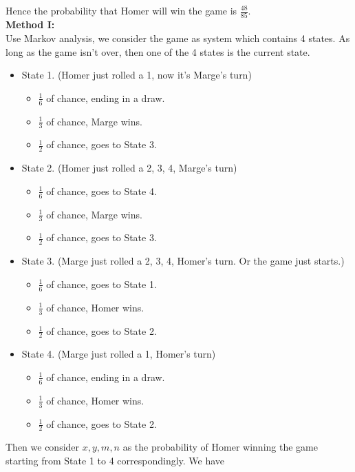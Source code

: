 \documentclass[a4paper, 11pt, twoside]{article}
\begin{document}
Hence the probability that Homer will win the game is $\frac{48}{85}.$\\

\textbf{Method I:}\\

Use Markov analysis, we consider the game as system which contains 4 states. As long as the game isn't over, then one of the 4 states is the current state.

\begin{itemize}
	\item State 1. (Homer just rolled a 1, now it's Marge's turn)
	\begin{itemize}
		\item $\frac{1}{6}$ of chance, ending in a draw.
		\item $\frac{1}{3}$ of chance, Marge wins.
		\item $\frac{1}{2}$ of chance, goes to State 3.
	\end{itemize}
	\item State 2. (Homer just rolled a 2, 3, 4, Marge's turn)
	\begin{itemize}
		\item $\frac{1}{6}$ of chance, goes to State 4.
		\item $\frac{1}{3}$ of chance, Marge wins.
		\item $\frac{1}{2}$ of chance, goes to State 3.
	\end{itemize}
	\item State 3. (Marge just rolled a 2, 3, 4, Homer's turn. Or the game just starts.)
	\begin{itemize}
		\item $\frac{1}{6}$ of chance, goes to State 1.
		\item $\frac{1}{3}$ of chance, Homer wins.
		\item $\frac{1}{2}$ of chance, goes to State 2.
	\end{itemize}
	\item State 4. (Marge just rolled a 1, Homer's turn)
	\begin{itemize}
		\item $\frac{1}{6}$ of chance, ending in a draw.
		\item $\frac{1}{3}$ of chance, Homer wins.
		\item $\frac{1}{2}$ of chance, goes to State 2.
	\end{itemize}
\end{itemize}

Then we consider $x, y, m, n$ as the probability of Homer winning the game starting from State 1 to 4 correspondingly. We have
\end{document}
